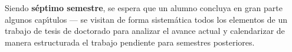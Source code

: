 \documentclass[10 pt]{article}
\begin{document}


Siendo {\bf s\'{e}ptimo semestre}, se espera que un alumno concluya en
gran parte algunos cap\'{\i}tulos --- se visitan de forma
sistem\'{a}tica todos los elementos de un trabajo de tesis de
doctorado para analizar el avance actual y calendarizar de manera
estructurada el trabajo pendiente para semestres posteriores.


\end{document}
